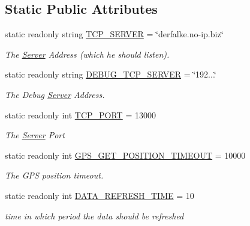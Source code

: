 \subsection*{Static Public Attributes}
\begin{DoxyCompactItemize}
\item 
static readonly string \hyperlink{classClient_1_1Common_1_1Constants_1_1ClientConstants_aa8e49cc5e62e4e4d0145a391eafb1283}{T\+C\+P\+\_\+\+S\+E\+R\+V\+E\+R} = \char`\"{}derfalke.\+no-\/ip.\+biz\char`\"{}
\begin{DoxyCompactList}\small\item\em The \hyperlink{namespaceServer}{Server} Address (which he should listen). \end{DoxyCompactList}\item 
static readonly string \hyperlink{classClient_1_1Common_1_1Constants_1_1ClientConstants_ac739ecedbea1293a68f6788d43b73b0c}{D\+E\+B\+U\+G\+\_\+\+T\+C\+P\+\_\+\+S\+E\+R\+V\+E\+R} = \char`\"{}192...\char`\"{}
\begin{DoxyCompactList}\small\item\em The Debug \hyperlink{namespaceServer}{Server} Address. \end{DoxyCompactList}\item 
static readonly int \hyperlink{classClient_1_1Common_1_1Constants_1_1ClientConstants_a7e1fb4d4a6b5b3026e6644cb37f4df75}{T\+C\+P\+\_\+\+P\+O\+R\+T} = 13000
\begin{DoxyCompactList}\small\item\em The \hyperlink{namespaceServer}{Server} Port \end{DoxyCompactList}\item 
static readonly int \hyperlink{classClient_1_1Common_1_1Constants_1_1ClientConstants_a8ec46ade3cfdee589d0c436c9aa1e714}{G\+P\+S\+\_\+\+G\+E\+T\+\_\+\+P\+O\+S\+I\+T\+I\+O\+N\+\_\+\+T\+I\+M\+E\+O\+U\+T} = 10000
\begin{DoxyCompactList}\small\item\em The G\+P\+S position timeout. \end{DoxyCompactList}\item 
static readonly int \hyperlink{classClient_1_1Common_1_1Constants_1_1ClientConstants_a1f32abf69f3d2c65bba380688e1c9909}{D\+A\+T\+A\+\_\+\+R\+E\+F\+R\+E\+S\+H\+\_\+\+T\+I\+M\+E} = 10
\begin{DoxyCompactList}\small\item\em time in which period the data should be refreshed \end{DoxyCompactList}\end{DoxyCompactItemize}


